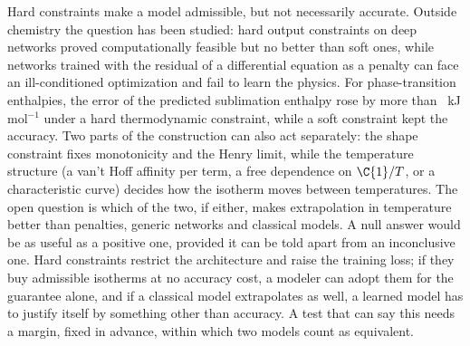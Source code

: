 \documentclass[journal=jcisd8,manuscript=article]{achemso}
\begin{document}
Hard constraints make a model admissible, but not necessarily accurate. Outside chemistry the question has been studied: hard
output constraints on deep networks proved computationally feasible but no better than soft ones\cite{marquezneila2017},
while networks trained with the residual of a differential equation as a penalty\cite{raissi2019} can face an
ill-conditioned optimization and fail to learn the physics\cite{krishnapriyan2021}. For phase-transition enthalpies, the error of
the predicted sublimation enthalpy rose by more than ~kJ\,mol$^{-1}$ under a hard thermodynamic
constraint, while a soft constraint kept the accuracy\cite{leenhouts2025}. Two parts of the construction can also act
separately: the shape constraint fixes monotonicity and the Henry limit, while the temperature structure (a van't
Hoff affinity per term, a free dependence on $\C{1}/T$, or a characteristic curve) decides how the isotherm moves
between temperatures. The open question is which of the two, if either, makes extrapolation in temperature better
than penalties, generic networks and classical models. A null answer would be as useful as a positive one, provided
it can be told apart from an inconclusive one. Hard constraints restrict the architecture and raise the training
loss; if they buy admissible isotherms at no accuracy cost, a modeler can adopt them for the guarantee alone, and if
a classical model extrapolates as well, a learned model has to justify itself by something other than accuracy. A
test that can say this needs a margin, fixed in advance, within which two models count as equivalent.
\end{document}
